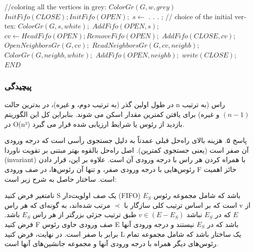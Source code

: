 \documentclass{book} %
\begin{document}
\begin{latin}
    
    \begin{algorithm}
        \caption{}\label{your_label}
        \begin{algorithmic}
            \STATE //coloring all the vertices in grey:
                \STATE $ColorGr(G, w, grey)$
            \ENDFOR
            \STATE $InitFifo(CLOSE); InitFifo(OPEN);$
            \STATE $s \leftarrow$ . . . ; // choice of the initial vertex:
            \STATE $ColorGr(G, s, white);$
            \STATE $AddFifo(OPEN, s);$
                \STATE $cv \leftarrow HeadFifo(OPEN); RemoveFifo(OPEN);$
                \STATE $AddFifo(CLOSE, cv);$
                \STATE $OpenNeighborsGr(G, cv);$
                    \STATE $ReadNeighborsGr(G, cv, neighb);$
                        \STATE $ColorGr(G, neighb, white);$
                        \STATE $AddFifo(OPEN, neighb);$
                    \ENDIF
                \ENDWHILE
            \ENDWHILE
            \STATE $write(CLOSE);$
            \STATE $END$
        \end{algorithmic}
    \end{algorithm}
        
\end{latin}

\subsubsection*{پیچیدگی}

در طول اولین گذر (به ترتیب دوم، و غیره)، در بدترین حالت n راس (به ترتیب $(n - 1)$ و غیره) برای یافتن کمترین مقدار اسکن می شوند. بنابراین کل این الگوریتم در O(n²) بازدید از رئوس یا شرایط ارزیابی شده قرار می گیرد.

پاسخ ۵.
هزینه بالای راه‌حل قبلی عمدتاً به دلیل جستجوی رأسی است که درجه ورودی آن صفر است (یعنی جستجوی کمترین). اصل راه‌حل بالقوه بهتر مبتنی بر تقویت ناوردا (invariant) با همراه کردن هر راس با درجه ورودی آن است. علاوه بر این، قرار دادن رئوس‌هایی با درجه ورودی صفر، و تنها آن رئوس‌ها، در صف ورودی F حائز اهمیت است. ساختار حاصل به شرح زیر است:

نامتغیر 
فرض کنید S یک صف اولویت‌دار (FIFO) باشد که شامل مجموعه رئوس $E_{S}$ است که بر اساس ترتیب کلی سازگار با $\prec$ مرتب شده‌اند، به گونه‌ای که هر راس v از $E$ که در $E_{S}$ نباشد $v \in (E - E_{S} )$ طبق ترتیب جزئی بزرگتر از هر راس $E_{S}$ باشد. فرض کنید F صف ورودی حاوی رئوس E باشد که در $E_{S}$ نیستند و درجه ورودی آنها برابر با صفر است. در نهایت، فرض کنید L یک ساختار باشد که شامل مجموعه تمام رئوس‌های دیگر همراه با درجه ورودی آنها و مجموعه جانشین‌های آنها است.
\end{document}
